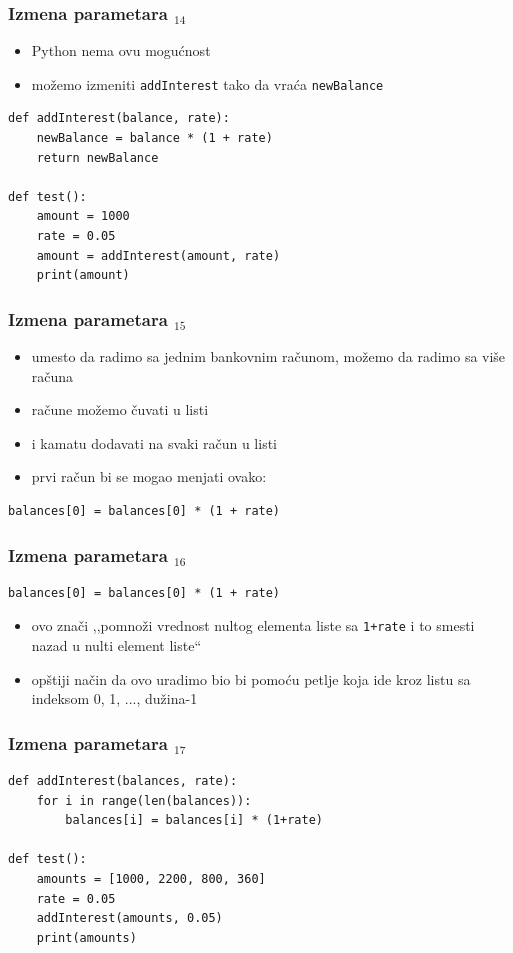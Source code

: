 \documentclass[compress]{beamer}
\begin{document}
\begin{frame}[fragile]
  \frametitle{Izmena parametara $_{14}$}
  \begin{itemize}
    \item Python nema ovu mogućnost
    \item možemo izmeniti \texttt{addInterest} tako da vraća \texttt{newBalance}
  \end{itemize}
\begin{verbatim}
def addInterest(balance, rate):
    newBalance = balance * (1 + rate)
    return newBalance

def test():
    amount = 1000
    rate = 0.05
    amount = addInterest(amount, rate)
    print(amount)
\end{verbatim}
\end{frame}

\begin{frame}[fragile]
  \frametitle{Izmena parametara $_{15}$}
  \begin{itemize}
    \item umesto da radimo sa jednim bankovnim računom, možemo da radimo sa više računa
    \item račune možemo čuvati u listi
    \item i kamatu dodavati na svaki račun u listi
    \item prvi račun bi se mogao menjati ovako:
  \end{itemize}
\begin{verbatim}
balances[0] = balances[0] * (1 + rate)
\end{verbatim}
\end{frame}

\begin{frame}[fragile]
  \frametitle{Izmena parametara $_{16}$}
\begin{verbatim}
balances[0] = balances[0] * (1 + rate)
\end{verbatim}
  \begin{itemize}
    \item ovo znači ,,pomnoži vrednost nultog elementa liste sa \texttt{1+rate} i to smesti nazad u nulti element liste``
    \item opštiji način da ovo uradimo bio bi pomoću petlje koja ide kroz listu sa indeksom 0, 1, ..., dužina-1
  \end{itemize}
\end{frame}

\begin{frame}[fragile]
  \frametitle{Izmena parametara $_{17}$}
\begin{verbatim}
def addInterest(balances, rate):
    for i in range(len(balances)):
        balances[i] = balances[i] * (1+rate)

def test():
    amounts = [1000, 2200, 800, 360]
    rate = 0.05
    addInterest(amounts, 0.05)
    print(amounts)
\end{verbatim}
\end{frame}
\end{document}
